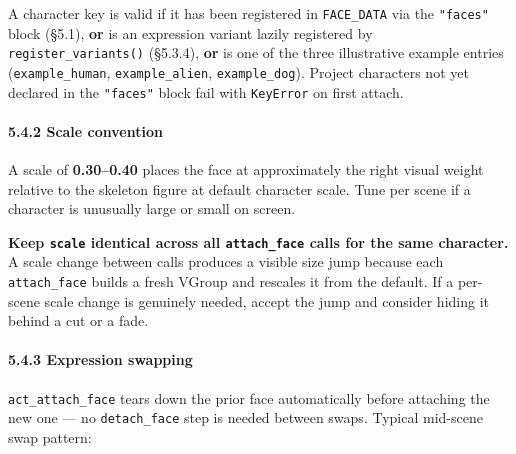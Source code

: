 \documentclass[
  12pt,
  letterpaper,
]{book}
\begin{document}
A character key is valid if it has been registered in
\texttt{FACE\_DATA} via the \texttt{"faces"} block (§5.1), \textbf{or}
is an expression variant lazily registered by
\texttt{register\_variants()} (§5.3.4), \textbf{or} is one of the three
illustrative example entries (\texttt{example\_human},
\texttt{example\_alien}, \texttt{example\_dog}). Project characters not
yet declared in the \texttt{"faces"} block fail with \texttt{KeyError}
on first attach.

\paragraph{5.4.2 Scale convention}\label{scale-convention}

A scale of \textbf{0.30--0.40} places the face at approximately the
right visual weight relative to the skeleton figure at default character
scale. Tune per scene if a character is unusually large or small on
screen.

\textbf{Keep \texttt{scale} identical across all \texttt{attach\_face}
calls for the same character.} A scale change between calls produces a
visible size jump because each \texttt{attach\_face} builds a fresh
VGroup and rescales it from the default. If a per-scene scale change is
genuinely needed, accept the jump and consider hiding it behind a cut or
a fade.

\paragraph{5.4.3 Expression swapping}\label{expression-swapping}

\texttt{act\_attach\_face} tears down the prior face automatically
before attaching the new one --- no \texttt{detach\_face} step is needed
between swaps. Typical mid-scene swap pattern:
\end{document}
